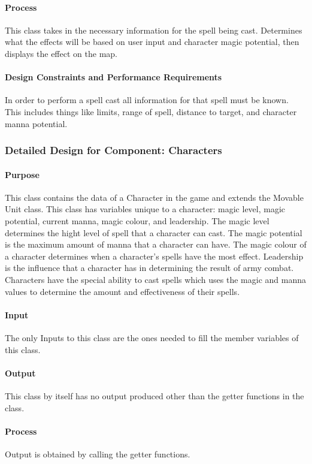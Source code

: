 \documentclass[12pt,a4paper,titlepage]{article}
\begin{document}
\paragraph{Process} This class takes in the necessary information for the spell being cast.  Determines what the effects will be based on user input and character magic potential, then displays the effect on the map.
\paragraph{Design Constraints and Performance Requirements} In order to perform a spell cast all information for that spell must be known.  This includes things like limits, range of spell, distance to target, and character manna potential.  

\subsubsection{Detailed Design for Component: Characters}
\paragraph{Purpose} This class contains the data of a Character in the game and extends the Movable Unit class. This class has variables unique to a character: magic level, magic potential, current manna, magic colour, and leadership. The magic level determines the hight level of spell that a character can cast. The magic potential is the maximum amount of manna that a character can have. The magic colour of a character determines when a character's spells have the most effect. Leadership is the influence that a character has in determining the result of army combat. Characters have the special ability to cast spells which uses the magic and manna values to determine the amount and effectiveness of their spells. 
\paragraph{Input} The only Inputs to this class are the ones needed to fill the member variables of this class.
\paragraph{Output} This class by itself has no output produced other than the getter functions in the class.
\paragraph{Process} Output is obtained by calling the getter functions. 
\end{document}
